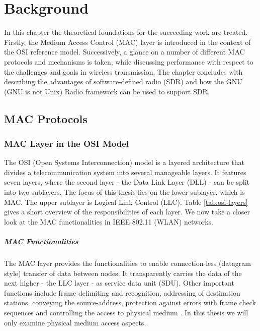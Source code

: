 \chapter{Background}
\label{ch:background}

In this chapter the theoretical foundations for the succeeding work are treated. Firstly, the Medium Access Control (MAC) layer is introduced in the context of the OSI reference model. Successively, a glance on a number of different MAC protocols and mechanisms is taken, while discussing performance with respect to the challenges and goals in wireless transmission. The chapter concludes with describing the advantages of software-defined radio (SDR) and how the GNU (GNU is not Unix) Radio framework can be used to support SDR.

\section{MAC Protocols}

\subsection{MAC Layer in the OSI Model}

The OSI (Open Systems Interconnection) model is a layered architecture that divides a telecommunication system into several manageable layers. It features seven layers, where the second layer - the Data Link Layer (DLL) - can be split into two sublayers. The focus of this thesis lies on the lower sublayer, which is MAC. The upper sublayer is Logical Link Control (LLC). Table \ref{tab:osi-layers} gives a short overview of the responsibilities of each layer. We now take a closer look at the MAC functionalities in IEEE 802.11 (WLAN) networks. 

\paragraph{MAC Functionalities} The MAC layer provides the functionalities to enable connection-less (datagram style) transfer of data between nodes. It transparently carries the data of the next higher - the LLC layer - as service data unit (SDU). Other important functions include frame delimiting and recognition, addressing of destination stations, conveying the source-address, protection against errors with frame check sequences and controlling the access to physical medium \cite{802-std}. In this thesis we will only examine physical medium access aspects. 

